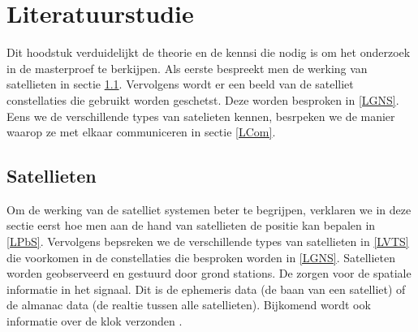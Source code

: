 \chapter{Literatuurstudie}
Dit hoodstuk verduidelijkt de theorie en de kennsi die nodig is om het onderzoek in de masterproef te berkijpen. Als eerste bespreekt men de werking van satellieten in sectie \ref{LSat}. Vervolgens wordt er een beeld van de satelliet constellaties die gebruikt worden geschetst. Deze worden besproken in \ref{LGNS}. Eens we de verschillende types van satelieten kennen, besrpeken we de manier waarop ze met elkaar communiceren in sectie \ref{LCom}.

\section{Satellieten}
\label{LSat}
Om de werking van de satelliet systemen beter te begrijpen, verklaren we in deze sectie eerst hoe men aan de hand van satellieten de positie kan bepalen in \ref{LPbS}. Vervolgens bepsreken we de verschillende types van satellieten in \ref{LVTS} die voorkomen in de constellaties die besproken worden in \ref{LGNS}. Satellieten worden geobserveerd en gestuurd door grond stations. De zorgen voor de spatiale informatie in het signaal. Dit is de ephemeris data (de baan van een satelliet) of de almanac data (de realtie tussen alle satellieten). Bijkomend wordt ook informatie over de klok verzonden \cite{LBibGNSS8}.

